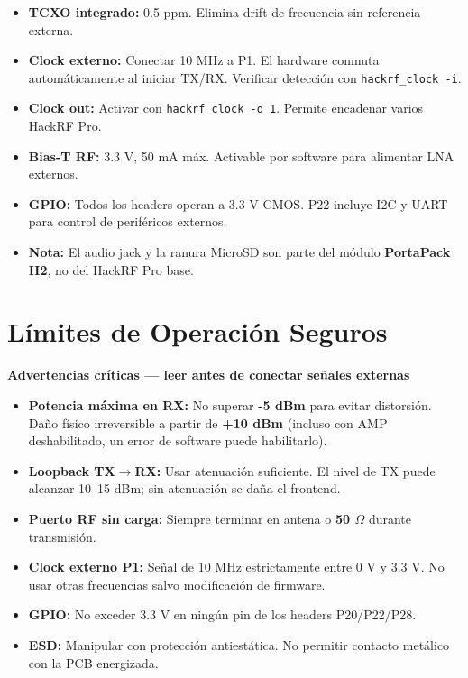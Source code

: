 \documentclass[11pt]{article}
\begin{document}
\begin{itemize}
    \item \textbf{TCXO integrado:} 0.5 ppm. Elimina drift de frecuencia sin referencia externa.
    \item \textbf{Clock externo:} Conectar 10 MHz a P1. El hardware conmuta automáticamente al iniciar TX/RX. Verificar detección con \texttt{hackrf\_clock -i}.
    \item \textbf{Clock out:} Activar con \texttt{hackrf\_clock -o 1}. Permite encadenar varios HackRF Pro.
    \item \textbf{Bias-T RF:} 3.3 V, 50 mA máx. Activable por software para alimentar LNA externos.
    \item \textbf{GPIO:} Todos los headers operan a 3.3 V CMOS. P22 incluye I2C y UART para control de periféricos externos.
    \item \textbf{Nota:} El audio jack y la ranura MicroSD son parte del módulo \textbf{PortaPack H2}, no del HackRF Pro base.
\end{itemize}

\section{Límites de Operación Seguros}

\begin{advertencia}
\textbf{Advertencias críticas — leer antes de conectar señales externas}
\end{advertencia}

\vspace{4pt}
\begin{itemize}
    \item \textbf{Potencia máxima en RX:} No superar \textbf{-5 dBm} para evitar distorsión. Daño físico irreversible a partir de \textbf{+10 dBm} (incluso con AMP deshabilitado, un error de software puede habilitarlo).
    \item \textbf{Loopback TX$\to$RX:} Usar atenuación suficiente. El nivel de TX puede alcanzar 10--15 dBm; sin atenuación se daña el frontend.
    \item \textbf{Puerto RF sin carga:} Siempre terminar en antena o \textbf{50 $\Omega$} durante transmisión.
    \item \textbf{Clock externo P1:} Señal de 10 MHz estrictamente entre 0 V y 3.3 V. No usar otras frecuencias salvo modificación de firmware.
    \item \textbf{GPIO:} No exceder 3.3 V en ningún pin de los headers P20/P22/P28.
    \item \textbf{ESD:} Manipular con protección antiestática. No permitir contacto metálico con la PCB energizada.
\end{itemize}
\end{document}
